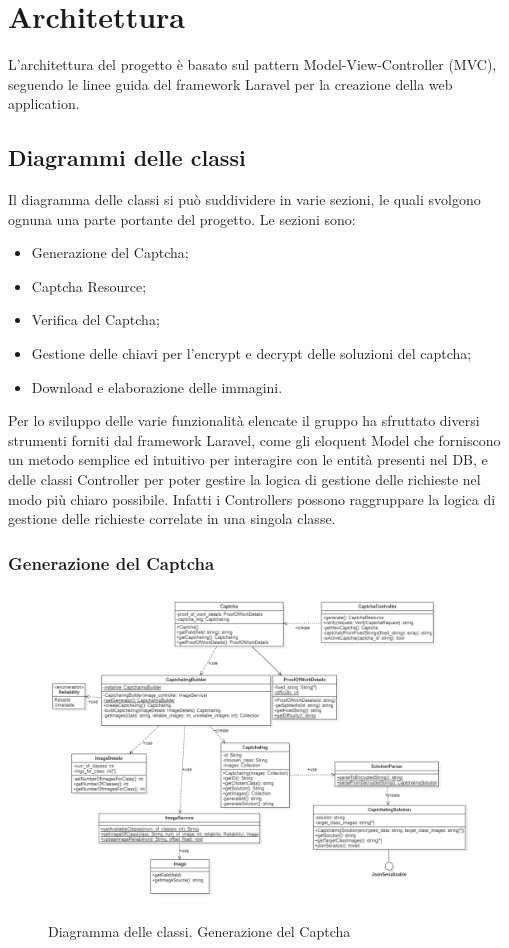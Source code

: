 \section{Architettura}
L'architettura del progetto è basato sul pattern Model-View-Controller (MVC), seguendo le linee guida del framework Laravel per la creazione della web application.


\subsection{Diagrammi delle classi}

Il diagramma delle classi si può suddividere in varie sezioni, le quali svolgono ognuna una parte portante del progetto. Le sezioni sono:
\begin{itemize}
    \item Generazione del Captcha;
    \item Captcha Resource;
    \item Verifica del Captcha;
    \item Gestione delle chiavi per l'encrypt e decrypt delle soluzioni del captcha;
    \item Download e elaborazione delle immagini.
\end{itemize}

Per lo sviluppo delle varie funzionalità elencate il gruppo ha sfruttato diversi strumenti forniti dal framework Laravel, come gli eloquent Model che forniscono un metodo semplice ed intuitivo per interagire con le entità presenti nel DB, e delle classi Controller per poter gestire la logica di gestione delle richieste nel modo più chiaro possibile. Infatti i Controllers possono raggruppare la logica di gestione delle richieste correlate in una singola classe.

\subsubsection{Generazione del Captcha}

\begin{figure}[H]
    \centering
    \includegraphics[scale = 0.45]{img/generate.png}\\
    \caption{Diagramma delle classi. Generazione del Captcha}
\end{figure}
\newpage

